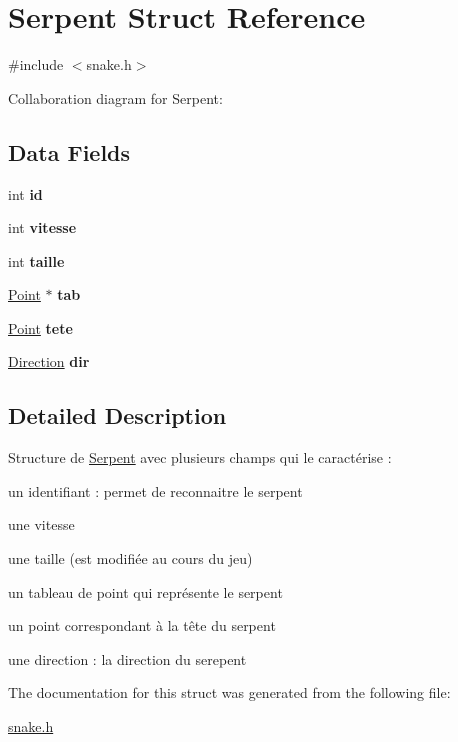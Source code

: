 \hypertarget{struct_serpent}{}\section{Serpent Struct Reference}
\label{struct_serpent}


{\ttfamily \#include $<$snake.\+h$>$}



Collaboration diagram for Serpent\+:
\subsection*{Data Fields}
\begin{DoxyCompactItemize}
\item 
\hypertarget{struct_serpent_a7441ef0865bcb3db9b8064dd7375c1ea}{}int {\bfseries id}\label{struct_serpent_a7441ef0865bcb3db9b8064dd7375c1ea}

\item 
\hypertarget{struct_serpent_a4b512d0a6dcc3c7d7e6dd9a7714852c4}{}int {\bfseries vitesse}\label{struct_serpent_a4b512d0a6dcc3c7d7e6dd9a7714852c4}

\item 
\hypertarget{struct_serpent_a29bf3fc0ffe4e72e45f0c84ab4f8cd1e}{}int {\bfseries taille}\label{struct_serpent_a29bf3fc0ffe4e72e45f0c84ab4f8cd1e}

\item 
\hypertarget{struct_serpent_ad44190bd0d6846f34b2f440d8b028653}{}\hyperlink{struct_point}{Point} $\ast$ {\bfseries tab}\label{struct_serpent_ad44190bd0d6846f34b2f440d8b028653}

\item 
\hypertarget{struct_serpent_a7029c13111e60317aa11bbabd7a6dd66}{}\hyperlink{struct_point}{Point} {\bfseries tete}\label{struct_serpent_a7029c13111e60317aa11bbabd7a6dd66}

\item 
\hypertarget{struct_serpent_a58d94fa8f7ddf189cd6eabdea4f2346c}{}\hyperlink{snake_8h_a224b9163917ac32fc95a60d8c1eec3aa}{Direction} {\bfseries dir}\label{struct_serpent_a58d94fa8f7ddf189cd6eabdea4f2346c}

\end{DoxyCompactItemize}


\subsection{Detailed Description}
Structure de \hyperlink{struct_serpent}{Serpent} avec plusieurs champs qui le caractérise \+:
\begin{DoxyItemize}
\item un identifiant \+: permet de reconnaitre le serpent
\item une vitesse
\item une taille (est modifiée au cours du jeu)
\item un tableau de point qui représente le serpent
\item un point correspondant à la tête du serpent
\item une direction \+: la direction du serepent 
\end{DoxyItemize}

The documentation for this struct was generated from the following file\+:\begin{DoxyCompactItemize}
\item 
\hyperlink{snake_8h}{snake.\+h}\end{DoxyCompactItemize}
